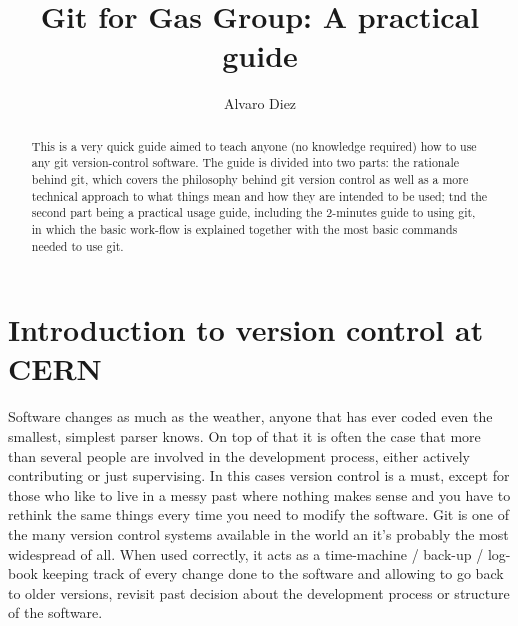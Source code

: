 \documentclass[runningheads,a4paper]{llncs}
\begin{document}
\mainmatter 

\title{Git for Gas Group: A practical guide}


\author{Alvaro Diez}



\tocauthor{{}}

\maketitle

\begin{abstract}
This is a very quick guide aimed to teach anyone (no knowledge required) how to use any git version-control software. The guide is divided into two parts: the rationale behind git, which covers the philosophy behind git version control as well as a more technical approach to what things mean and how they are intended to be used; tnd the second part being a practical usage guide, including the 2-minutes guide to using git, in which the basic work-flow is explained together with the most basic commands needed to use git.
\end{abstract}
\newpage

\medskip

\begingroup
\let\clearpage\relax
\tableofcontents
\newpage
{}
\endgroup

\medskip
\medskip

\section*{Introduction to version control at CERN}

Software changes as much as the weather, anyone that has ever coded even the smallest, simplest parser knows. On top of that it is often the case that more than several people are involved in the development process, either actively contributing or just supervising. In this cases version control is a must, except for those who like to live in a messy past where nothing makes sense and you have to rethink the same things every time you need to modify the software. Git is one of the many version control systems available in the world an it's probably the most widespread of all. When used correctly, it acts as a time-machine / back-up / log-book keeping track of every change done to the software and allowing to go back to older versions, revisit past decision about the development process or structure of the software.
\end{document}
